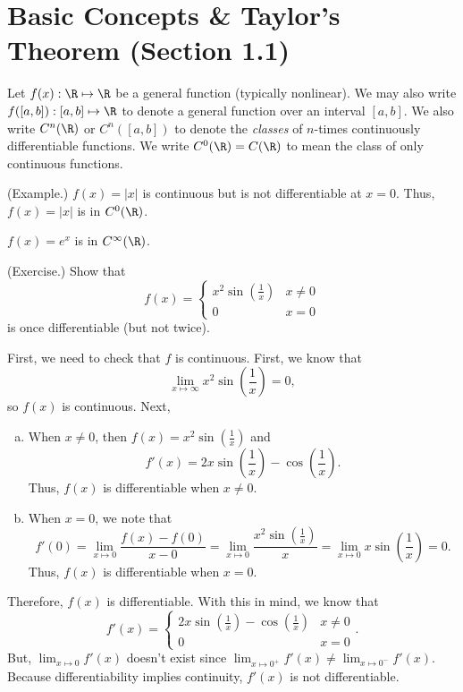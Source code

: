 \documentclass[letterpaper]{article}
\begin{document}
\section{Basic Concepts \& Taylor's Theorem (Section 1.1)}
Let $f(x): \R \mapsto \R$ be a general function (typically nonlinear). We may also write $f([a, b]): [a, b] \mapsto \R$ to denote a general function over an interval $[a, b]$. We also write $C^n (\R)$ or $C^n ([a, b])$ to denote the \emph{classes} of $n$-times continuously differentiable functions. We write $C^0 (\R) = C(\R)$ to mean the class of only continuous functions. 

\begin{mdframed}
    (Example.) $f(x) = |x|$ is continuous but is not differentiable at $x = 0$. Thus, $f(x) = |x|$ is in $C^0 (\R)$. 

    \bigskip 

    $f(x) = e^x$ is in $C^\infty (\R)$.
\end{mdframed}

\begin{mdframed}
    (Exercise.) Show that \[f(x) = \begin{cases}
        x^2 \sin\left(\frac{1}{x}\right) & x \neq 0 \\ 
        0 & x = 0
    \end{cases}\] is once differentiable (but not twice).

    \begin{mdframed}
        First, we need to check that $f$ is continuous. First, we know that \[\lim_{x \mapsto \infty} x^2 \sin\left(\frac{1}{x}\right) = 0,\] so $f(x)$ is continuous. Next, 
        \begin{enumerate}[(a)]
            \item When $x \neq 0$, then $f(x) = x^2 \sin\left(\frac{1}{x}\right)$ and \[f'(x) = 2x\sin\left(\frac{1}{x}\right) - \cos\left(\frac{1}{x}\right).\] Thus, $f(x)$ is differentiable when $x \neq 0$. 
            \item When $x = 0$, we note that \[f'(0) = \lim_{x \mapsto 0} \frac{f(x) - f(0)}{x - 0} = \lim_{x \mapsto 0} \frac{x^2 \sin\left(\frac{1}{x}\right)}{x} = \lim_{x \mapsto 0} x\sin\left(\frac{1}{x}\right) = 0.\] Thus, $f(x)$ is differentiable when $x = 0$.
        \end{enumerate}
        Therefore, $f(x)$ is differentiable. With this in mind, we know that 
        \[f'(x) = \begin{cases}
            2x\sin\left(\frac{1}{x}\right) - \cos\left(\frac{1}{x}\right) & x \neq 0 \\ 
            0 & x = 0
        \end{cases}.\]
        But, $\lim_{x \mapsto 0} f'(x)$ doesn't exist since $\lim_{x \mapsto 0^+} f'(x) \neq \lim_{x \mapsto 0^-} f'(x)$. Because differentiability implies continuity, $f'(x)$ is not differentiable. 
    \end{mdframed}
\end{mdframed}
\end{document}
